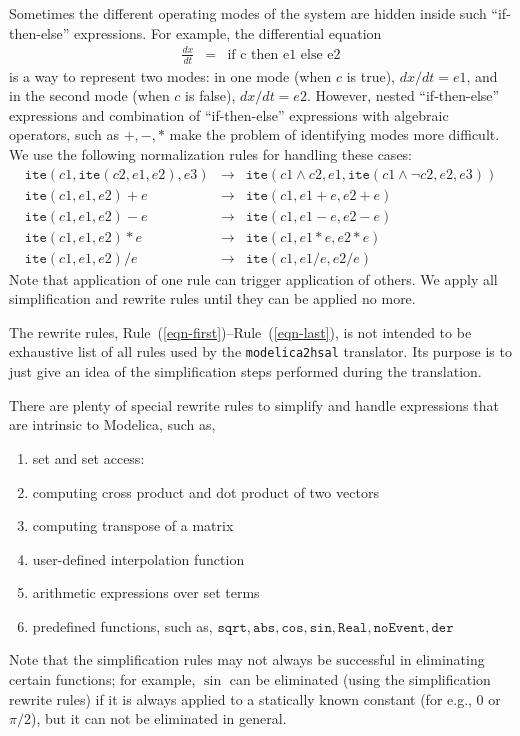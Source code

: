 \documentclass{llncs}
\newcommand\ite{{\mathtt{ite}}}
\begin{document}
\begin{description}
Sometimes the different operating modes of the system are hidden inside such
``if-then-else'' expressions.
For example, the differential equation 
\begin{eqnarray*}
 \frac{dx}{dt} & = & \mbox{if c then e1 else e2}
\end{eqnarray*}
is a way to represent two modes: in one mode (when $c$ is true), $dx/dt = e1$,
and in the second mode (when $c$ is false), $dx/dt = e2$.
However, nested ``if-then-else'' expressions and combination of ``if-then-else'' expressions
with algebraic operators, such as $+, -, *$ make the problem of identifying modes more
difficult.
We use the following normalization rules for handling these cases:
\begin{eqnarray}
 \ite(c1,\ite(c2,e1,e2),e3) & \rightarrow & 
 \ite(c1\wedge c2,e1, \ite(c1 \wedge\neg c2, e2, e3))
\\
 \ite(c1,e1,e2) + e & \rightarrow & \ite(c1,e1+e,e2+e)
\\
 \ite(c1,e1,e2) - e & \rightarrow & \ite(c1,e1-e,e2-e)
\\
 \ite(c1,e1,e2) * e & \rightarrow & \ite(c1,e1*e,e2*e)
\\
 \ite(c1,e1,e2) / e & \rightarrow & \ite(c1,e1/e,e2/e)
\label{eqn-last}
\end{eqnarray}
Note that application of one rule can trigger application of others.
We apply all simplification and rewrite rules until they can be applied
no more.
\end{description}

The rewrite rules, Rule~(\ref{eqn-first})--Rule~(\ref{eqn-last}),
is not intended to be exhaustive list of all rules used by the
{\tt{modelica2hsal}} translator.  Its purpose is to just give an
idea of the simplification steps performed during the translation.

There are plenty of special rewrite rules to simplify and handle expressions
that are intrinsic to Modelica, such as,
\begin{enumerate}
\item set and set access:
\item computing cross product and dot product of two vectors
\item computing transpose of a matrix
\item user-defined interpolation function
\item arithmetic expressions over set terms
\item predefined functions, such as, $\mathtt{sqrt, abs, cos, sin, Real, noEvent, der}$
\end{enumerate}
Note that the simplification rules may not always be successful in eliminating 
certain functions; for example, $\sin$ can be eliminated (using the simplification
rewrite rules) if it is always applied to
a statically known constant (for e.g., $0$ or $\pi/2$), but it can not be eliminated in general.
\end{document}
